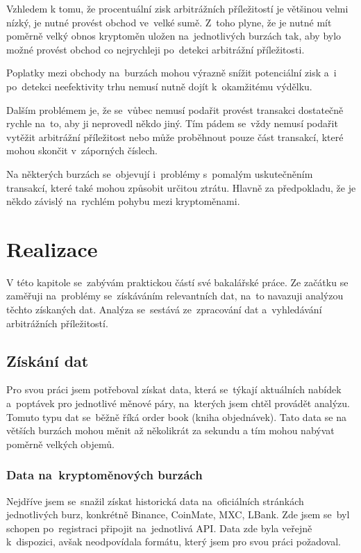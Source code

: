 \documentclass[thesis=B,czech]{FITthesis}[2019/03/21]
\begin{document}
Vzhledem k tomu, že procentuální zisk arbitrážních příležitostí je většinou velmi nízký, je nutné provést obchod ve~velké sumě. Z~toho plyne, že je nutné mít poměrně velký obnos kryptoměn uložen na~jednotlivých burzách tak, aby bylo možné provést obchod co nejrychleji po~detekci arbitrážní příležitosti. 

Poplatky mezi obchody na~burzách mohou výrazně snížit potenciální zisk a~i po~detekci neefektivity trhu nemusí nutně dojít k~okamžitému výdělku.  

Dalším problémem je, že se~vůbec nemusí podařit provést transakci dostatečně rychle na~to, aby ji neprovedl někdo jiný. Tím pádem se~vždy nemusí podařit vytěžit arbitrážní příležitost nebo může proběhnout pouze část transakcí, které mohou skončit v~záporných číslech.

Na některých burzách se~objevují i~problémy s~pomalým uskutečněním transakcí, které také mohou způsobit určitou ztrátu. Hlavně za předpokladu, že je někdo závislý na~rychlém pohybu mezi kryptoměnami. \cite{finder}

\chapter{Realizace}
V této kapitole se~zabývám praktickou částí své bakalářské práce. Ze začátku se zaměřuji na~problémy se~získáváním relevantních dat, na~to navazuji analýzou těchto získaných dat. Analýza se~sestává ze~zpracování dat a~vyhledávání arbitrážních příležitostí.

\section{Získání dat}
Pro svou práci jsem potřeboval získat data, která se~týkají aktuálních nabídek a~poptávek pro jednotlivé měnové páry, na~kterých jsem chtěl provádět analýzu. Tomuto typu dat se~běžně říká order book (kniha objednávek). Tato data se na větších burzách mohou měnit až několikrát za sekundu a tím mohou nabývat poměrně velkých objemů. 

\subsection{Data na~kryptoměnových burzách}
Nejdříve jsem se~snažil získat historická data na~oficiálních stránkách jednotlivých burz, konkrétně Binance, CoinMate, MXC, LBank. Zde jsem se~byl schopen po~registraci připojit na~jednotlivá API. Data zde byla veřejně k~dispozici, avšak neodpovídala formátu, který jsem pro svou práci požadoval. 
\end{document}
